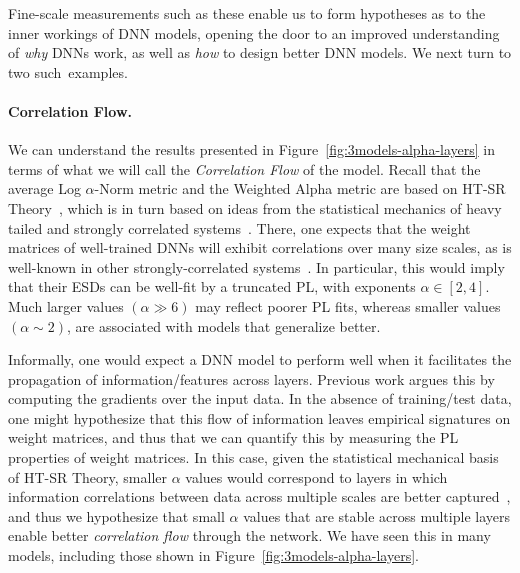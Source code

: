 Fine-scale measurements such as these enable us to form hypotheses as to the inner workings of DNN models, opening the door to an improved understanding of \emph{why} DNNs work, as well as \emph{how} to design better DNN models.
We next turn to two such~examples.

\vspace{-1mm}
\paragraph{Correlation Flow.}

We can understand the results presented in Figure~\ref{fig:3models-alpha-layers} in terms of what we will call the \emph{Correlation Flow} of the model. 
Recall that the average Log $\alpha$-Norm metric and the Weighted Alpha metric are based on HT-SR Theory~\cite{MM18_TR, MM19_HTSR_ICML, MM20_SDM}, which is in turn based on ideas from the statistical mechanics of heavy tailed and strongly correlated systems~\cite{BouchaudPotters03, SornetteBook, BP11, bun2017}. 
There, one expects that the weight matrices of well-trained DNNs will exhibit correlations over many size scales, as is well-known in other strongly-correlated systems~\cite{BouchaudPotters03, SornetteBook}. 
In particular, this would imply that their ESDs can be well-fit by a truncated PL, with exponents $\alpha\in[2,4]$.
Much larger values $(\alpha\gg 6)$ may reflect poorer PL fits, whereas smaller values $(\alpha\sim 2)$, are associated with models that generalize better.

Informally, one would expect a DNN model to perform well when it facilitates the propagation of information/features across layers.
Previous work argues this by computing the gradients over the input data.
In the absence of training/test data, one might hypothesize that this flow of information leaves empirical signatures on weight matrices, and thus that we can quantify this by measuring the PL properties of weight matrices.
In this case, given the statistical mechanical basis of HT-SR Theory, smaller $\alpha$ values would correspond to layers in which information correlations between data across multiple scales are better captured~\cite{MM18_TR,SornetteBook}, and thus we hypothesize that small $\alpha$ values that are stable across multiple layers enable better \emph{correlation flow} through the network.
We have seen this in many models, including those shown in Figure~\ref{fig:3models-alpha-layers}.

